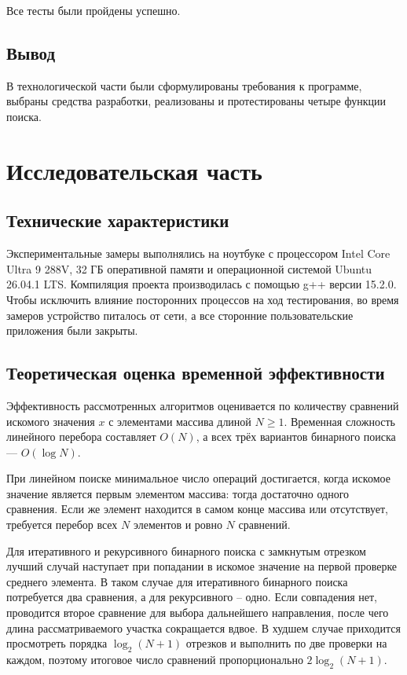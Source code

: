 Все тесты были пройдены успешно.

\section*{Вывод}

В технологической части были сформулированы требования к 
программе, выбраны средства разработки, реализованы и протестированы
четыре функции поиска.

\chapter{Исследовательская часть}

\section{Технические характеристики}

Экспериментальные замеры выполнялись на ноутбуке с 
процессором Intel Core Ultra 9 288V, 32 ГБ оперативной 
памяти и операционной системой Ubuntu 26.04.1 LTS. 
Компиляция проекта производилась с помощью g++ версии 15.2.0. 
Чтобы исключить влияние посторонних процессов на ход 
тестирования, во время замеров устройство 
питалось от сети, а все сторонние пользовательские 
приложения были закрыты.

\section{Теоретическая оценка временной эффективности}

Эффективность рассмотренных алгоритмов оценивается по 
количеству сравнений искомого значения $x$ с элементами 
массива длиной $N \ge 1$. Временная сложность линейного 
перебора составляет $O(N)$, а всех трёх вариантов бинарного 
поиска — $O(\log N)$.

При линейном поиске минимальное число операций достигается, 
когда искомое значение является первым элементом массива: тогда 
достаточно одного сравнения. Если же элемент находится в 
самом конце массива или отсутствует, требуется перебор 
всех $N$ элементов и ровно $N$ сравнений.

Для итеративного и рекурсивного бинарного поиска с 
замкнутым отрезком лучший случай наступает при попадании в 
искомое значение на первой проверке среднего элемента.
В таком случае для итеративного бинарного поиска потребуется два
сравнения, а для рекурсивного -- одно. Если совпадения нет, 
проводится второе сравнение для выбора дальнейшего направления, 
после чего длина рассматриваемого участка сокращается вдвое. 
В худшем случае приходится просмотреть порядка $\log_2(N + 1)$ 
отрезков и выполнить по две проверки на каждом, 
поэтому итоговое число сравнений пропорционально $2 \log_2(N + 1)$.

